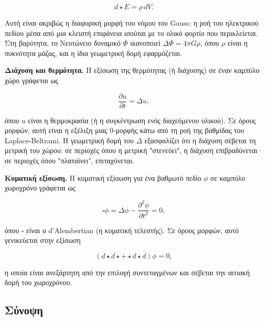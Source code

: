 \documentclass[12pt]{article}
\begin{document}
\[
d \star E = \rho \, dV.
\]

Αυτή είναι ακριβώς η διαφορική μορφή του νόμου του Gauss: η ροή του ηλεκτρικού πεδίου μέσα από μια κλειστή επιφάνεια ισούται με το ολικό φορτίο που περικλείεται. Στη βαρύτητα, το Νευτώνειο δυναμικό $\Phi$ ικανοποιεί $\Delta \Phi = 4\pi G \rho$, όπου $\rho$ είναι η πυκνότητα μάζας, και η ίδια γεωμετρική δομή εφαρμόζεται.

\textbf{Διάχυση και θερμότητα.} Η εξίσωση της θερμότητας (ή διάχυσης) σε έναν καμπύλο χώρο γράφεται ως

\[
\frac{\partial u}{\partial t} = \Delta u,
\]

όπου $u$ είναι η θερμοκρασία (ή η συγκέντρωση ενός διαχεόμενου υλικού). Σε όρους μορφών, αυτή είναι η εξέλιξη μιας 0-μορφής κάτω από τη ροή της βαθμίδας του Laplace-Beltrami. Η γεωμετρική δομή του $\Delta$ εξασφαλίζει ότι η διάχυση σέβεται τη μετρική του χώρου: σε περιοχές όπου η μετρική "στενεύει", η διάχυση επιβραδύνεται· σε περιοχές όπου "πλαταίνει", επιταχύνεται.

\textbf{Κυματική εξίσωση.} Η κυματική εξίσωση για ένα βαθμωτό πεδίο $\phi$ σε καμπύλο χωροχρόνο γράφεται ως

\[
\square \phi = \Delta \phi - \frac{\partial^2 \phi}{\partial t^2} = 0,
\]

όπου $\square$ είναι ο d'Alembertian (η κυματική τελεστής). Σε όρους μορφών, αυτό γενικεύεται στην εξίσωση

\[
(d \star d \star + \star d \star d) \phi = 0,
\]

η οποία είναι ανεξάρτητη από την επιλογή συντεταγμένων και σέβεται την αιτιακή δομή του χωροχρόνου.

\subsection{Σύνοψη}
\end{document}
